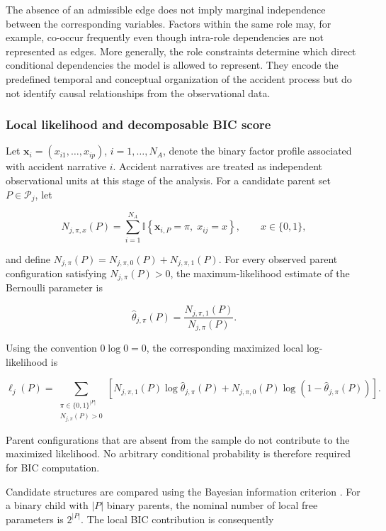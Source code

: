The absence of an admissible edge does not imply marginal independence between
the corresponding variables. Factors within the same role may, for example,
co-occur frequently even though intra-role dependencies are not represented
as edges. More generally, the role constraints determine which direct
conditional dependencies the model is allowed to represent. They encode the
predefined temporal and conceptual organization of the accident process but
do not identify causal relationships from the observational data.


\subsubsection{Local likelihood and decomposable BIC score}
\label{sec:chap4_global_bn_score}

Let
\(\mathbf x_i=(x_{i1},\ldots,x_{ip})\),
\(i=1,\ldots,N_A\),
denote the binary factor profile associated with accident narrative \(i\).
Accident narratives are treated as independent observational units at this
stage of the analysis. For a candidate parent set
\(P\in\mathcal P_j\), let

\[
N_{j,\pi,x}(P)
=
\sum_{i=1}^{N_A}
\mathbb I
\left\{
\mathbf x_{i,P}=\pi,\;
x_{ij}=x
\right\},
\qquad
x\in\{0,1\},
\]

and define
\(N_{j,\pi}(P)
=
N_{j,\pi,0}(P)+N_{j,\pi,1}(P)\).
For every observed parent configuration satisfying
\(N_{j,\pi}(P)>0\), the maximum-likelihood estimate of the Bernoulli
parameter is

\[
\widehat\theta_{j,\pi}(P)
=
\frac{N_{j,\pi,1}(P)}
     {N_{j,\pi}(P)}.
\]

Using the convention \(0\log 0=0\), the corresponding maximized local
log-likelihood is

\[
\ell_j(P)
=
\sum_{\substack{
\pi\in\{0,1\}^{|P|}\\
N_{j,\pi}(P)>0}}
\left[
N_{j,\pi,1}(P)
\log\widehat\theta_{j,\pi}(P)
+
N_{j,\pi,0}(P)
\log
\left(
1-\widehat\theta_{j,\pi}(P)
\right)
\right].
\]

Parent configurations that are absent from the sample do not contribute to
the maximized likelihood. No arbitrary conditional probability is therefore
required for BIC computation.

Candidate structures are compared using the Bayesian information criterion
\citep{schwarz1978estimating}. For a binary child with \(|P|\) binary
parents, the nominal number of local free parameters is \(2^{|P|}\).
The local BIC contribution is consequently

